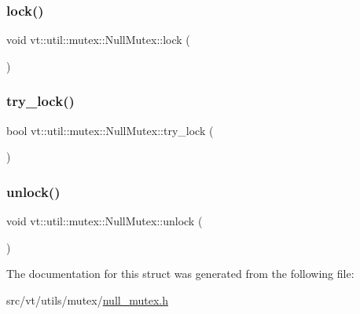 \subsubsection{\texorpdfstring{lock()}{lock()}}
{\footnotesize\ttfamily void vt\+::util\+::mutex\+::\+Null\+Mutex\+::lock (\begin{DoxyParamCaption}{ }\end{DoxyParamCaption})\hspace{0.3cm}{\ttfamily [inline]}}

\mbox{\label{structvt_1_1util_1_1mutex_1_1_null_mutex_a12001b9a741d4cf8777cd0caf8e2084f}} 
\subsubsection{\texorpdfstring{try\+\_\+lock()}{try\_lock()}}
{\footnotesize\ttfamily bool vt\+::util\+::mutex\+::\+Null\+Mutex\+::try\+\_\+lock (\begin{DoxyParamCaption}{ }\end{DoxyParamCaption})\hspace{0.3cm}{\ttfamily [inline]}}

\mbox{\label{structvt_1_1util_1_1mutex_1_1_null_mutex_ac87de5bb43fd843c2f3fcf3f66d130df}} 
\subsubsection{\texorpdfstring{unlock()}{unlock()}}
{\footnotesize\ttfamily void vt\+::util\+::mutex\+::\+Null\+Mutex\+::unlock (\begin{DoxyParamCaption}{ }\end{DoxyParamCaption})\hspace{0.3cm}{\ttfamily [inline]}}



The documentation for this struct was generated from the following file\+:\begin{DoxyCompactItemize}
\item 
src/vt/utils/mutex/\hyperlink{null__mutex_8h}{null\+\_\+mutex.\+h}\end{DoxyCompactItemize}
